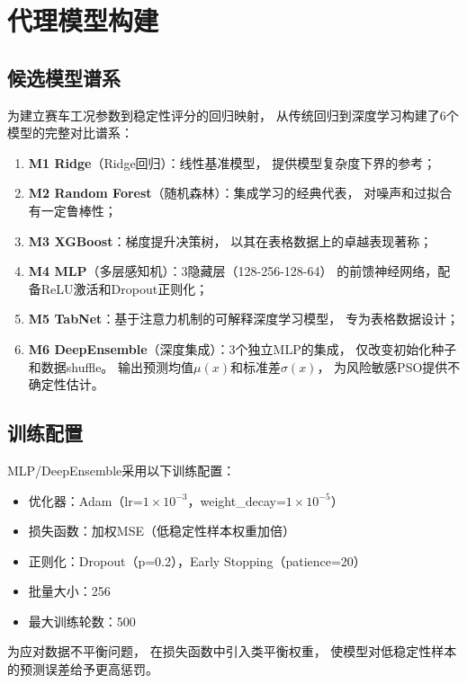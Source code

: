 \section{代理模型构建}

\subsection{候选模型谱系}

为建立赛车工况参数到稳定性评分的回归映射，
从传统回归到深度学习构建了6个模型的完整对比谱系：

\begin{enumerate}
    \item \textbf{M1 Ridge}（Ridge回归）：线性基准模型，
        提供模型复杂度下界的参考；
    \item \textbf{M2 Random Forest}（随机森林）：集成学习的经典代表，
        对噪声和过拟合有一定鲁棒性；
    \item \textbf{M3 XGBoost}：梯度提升决策树，
        以其在表格数据上的卓越表现著称；
    \item \textbf{M4 MLP}（多层感知机）：3隐藏层（128-256-128-64）
        的前馈神经网络，配备ReLU激活和Dropout正则化；
    \item \textbf{M5 TabNet}：基于注意力机制的可解释深度学习模型，
        专为表格数据设计；
    \item \textbf{M6 DeepEnsemble}（深度集成）：3个独立MLP的集成，
        仅改变初始化种子和数据shuffle。
        输出预测均值$\mu(x)$和标准差$\sigma(x)$，
        为风险敏感PSO提供不确定性估计。
\end{enumerate}

\subsection{训练配置}

MLP/DeepEnsemble采用以下训练配置：
\begin{itemize}
    \item 优化器：Adam（lr=$1\times10^{-3}$，weight\_decay=$1\times10^{-5}$）
    \item 损失函数：加权MSE（低稳定性样本权重加倍）
    \item 正则化：Dropout（p=0.2），Early Stopping（patience=20）
    \item 批量大小：256
    \item 最大训练轮数：500
\end{itemize}

为应对数据不平衡问题，
在损失函数中引入类平衡权重，
使模型对低稳定性样本的预测误差给予更高惩罚。

